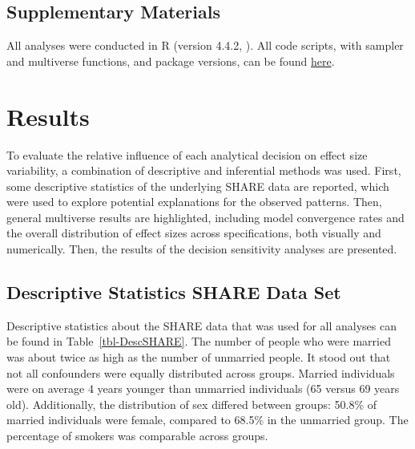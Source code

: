 \documentclass[
  man,
  floatsintext,
  longtable,
  nolmodern,
  notxfonts,
  notimes,
  colorlinks=true,linkcolor=blue,citecolor=blue,urlcolor=blue]{apa7}
\begin{document}
\subsection{Supplementary Materials}\label{supplementary-materials}

All analyses were conducted in R (version 4.4.2,
). All code scripts, with
sampler and multiverse functions, and package versions, can be found
\href{https://github.com/lodewijn/ManyAnalystThesisCompendium}{here}.

\section{Results}\label{results}

To evaluate the relative influence of each analytical decision on effect
size variability, a combination of descriptive and inferential methods
was used. First, some descriptive statistics of the underlying SHARE
data are reported, which were used to explore potential explanations for
the observed patterns. Then, general multiverse results are highlighted,
including model convergence rates and the overall distribution of effect
sizes across specifications, both visually and numerically. Then, the
results of the decision sensitivity analyses are presented.

\subsection{Descriptive Statistics SHARE Data
Set}\label{descriptive-statistics-share-data-set}

Descriptive statistics about the SHARE data that was used for all
analyses can be found in Table~\ref{tbl-DescSHARE}. The number of people
who were married was about twice as high as the number of unmarried
people. It stood out that not all confounders were equally distributed
across groups. Married individuals were on average 4 years younger than
unmarried individuals (65 versus 69 years old). Additionally, the
distribution of sex differed between groups: 50.8\% of married
individuals were female, compared to 68.5\% in the unmarried group. The
percentage of smokers was comparable across groups.
\end{document}
